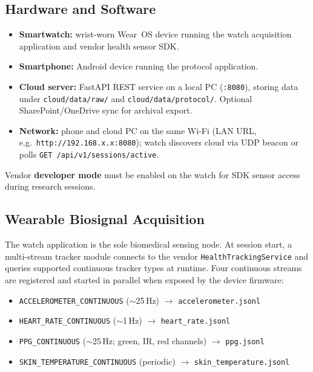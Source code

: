\documentclass[sensors,article,submit,pdftex,moreauthors]{Definitions/mdpi}
\begin{document}
\subsection{Hardware and Software}



\begin{itemize}

\item \textbf{Smartwatch:} wrist-worn Wear~OS device running the watch acquisition application and vendor health sensor SDK.

\item \textbf{Smartphone:} Android device running the protocol application.

\item \textbf{Cloud server:} FastAPI REST service on a local PC (\texttt{:8080}), storing data under \texttt{cloud/data/raw/} and \texttt{cloud/data/protocol/}. Optional SharePoint/OneDrive sync for archival export.

\item \textbf{Network:} phone and cloud PC on the same Wi-Fi (LAN URL, e.g.\ \texttt{http://192.168.x.x:8080}); watch discovers cloud via UDP beacon or polls \texttt{GET /api/v1/sessions/active}.

\end{itemize}



Vendor \textbf{developer mode} must be enabled on the watch for SDK sensor access during research sessions.



\subsection{Wearable Biosignal Acquisition}



The watch application is the sole biomedical sensing node. At session start, a multi-stream tracker module connects to the vendor \texttt{HealthTrackingService} and queries supported continuous tracker types at runtime. Four continuous streams are registered and started in parallel when exposed by the device firmware:



\begin{itemize}

\item \texttt{ACCELEROMETER\_CONTINUOUS} (${\sim}$25\,Hz) $\rightarrow$ \texttt{accelerometer.jsonl}

\item \texttt{HEART\_RATE\_CONTINUOUS} (${\sim}$1\,Hz) $\rightarrow$ \texttt{heart\_rate.jsonl}

\item \texttt{PPG\_CONTINUOUS} (${\sim}$25\,Hz; green, IR, red channels) $\rightarrow$ \texttt{ppg.jsonl}

\item \texttt{SKIN\_TEMPERATURE\_CONTINUOUS} (periodic) $\rightarrow$ \texttt{skin\_temperature.jsonl}

\end{itemize}
\end{document}
